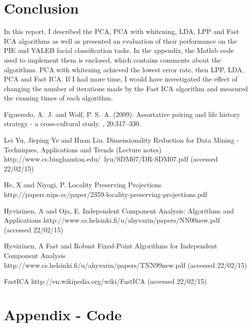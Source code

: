 \documentclass[12pt]{article} %
\begin{document}
\section{Conclusion} %
In this report, I described the PCA, PCA with whitening, LDA, LPP and Fast ICA algorithms as well as presented an evaluation of their performance on the PIE and YALEB facial classification tasks. In the appendix, the Matlab code used to implement them is enclosed, which contains comments about the algorithms. PCA with whitening achieved the lowest error rate, then LPP, LDA, PCA and Fast ICA. If I had more time, I would have investigated the effect of changing the number of iterations made by the Fast ICA algorithm and measured the running times of each algorithm.


\begin{thebibliography}{99} %

Figueredo, A.~J. and Wolf, P. S.~A. (2009).
\newblock Assortative pairing and life history strategy - a cross-cultural
  study.
, 20:317--330.
 
Lei Yu, Jieping Ye and Huan Liu.
\newblock Dimensionality Reduction for Data Mining - Techniques, Applications and Trends (Lecture notes)
\newblock http://www.cs.binghamton.edu/~lyu/SDM07/DR-SDM07.pdf (accessed 22/02/15)

He, X and Niyogi, P.
\newblock Locality Preserving Projections
\newblock http://papers.nips.cc/paper/2359-locality-preserving-projections.pdf

Hyvärinen, A and Oja, E.
\newblock Independent Component Analysis: Algorithms and Applications
\newblock http://www.cs.helsinki.fi/u/ahyvarin/papers/NN00new.pdf (accessed 22/02/15)

Hyvärinen, A
\newblock Fast and Robust Fixed-Point Algorithms for Independent Component Analysis
\newblock http://www.cs.helsinki.fi/u/ahyvarin/papers/TNN99new.pdf (accessed 22/02/15)

FastICA
\newblock http://en.wikipedia.org/wiki/FastICA (accessed 22/02/15)
\end{thebibliography}


\section{Appendix - Code}


\linespread{1} %







\end{document}
